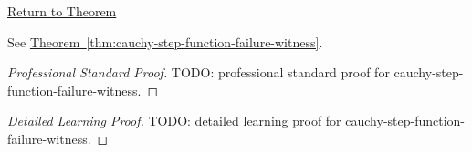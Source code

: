 \newpage
{}
\label{prf:cauchy-step-function-failure-witness}

\begin{remark*}[Return]
\hyperref[thm:cauchy-step-function-failure-witness]{Return to Theorem}
\end{remark*}

\begin{theorem*}
See \hyperref[thm:cauchy-step-function-failure-witness]{Theorem~\ref*{thm:cauchy-step-function-failure-witness}}.
\end{theorem*}

\begin{proof}[Professional Standard Proof]
\LRAProofBodyStart
TODO: professional standard proof for cauchy-step-function-failure-witness.
\end{proof}

\begin{proof}[Detailed Learning Proof]
\LRAProofBodyStart
TODO: detailed learning proof for cauchy-step-function-failure-witness.
\end{proof}

\begin{remark*}
\end{remark*}

\begin{dependencies}
\NoLocalDependencies
\end{dependencies}

\clearpage
